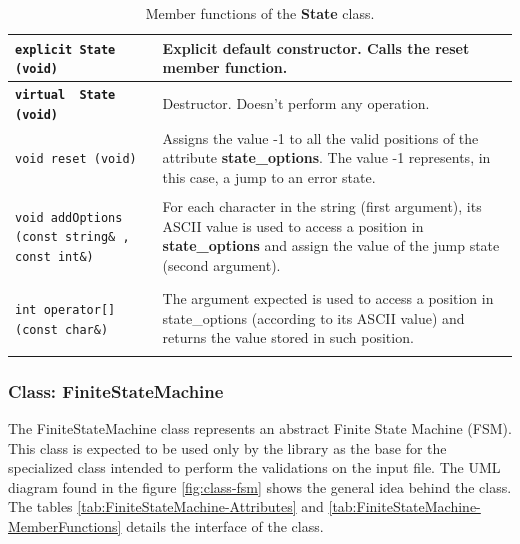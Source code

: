 \documentclass[11pt,twoside,openany,x11names,svgnames]{memoir}
\begin{document}
\begin{table}[h]\footnotesize
\centering
\begin{tabular}{| >{\bfseries}p{7.5cm} | p{8cm} |}
	\hline
	
	\texttt{explicit State (void)} & Explicit default constructor. Calls the \textbf{reset} member function. \\
	
	\hline
	
	\texttt{virtual ~State (void)} & Destructor. Doesn't perform any operation. \\
	
	\hline
	
	\texttt{void reset (void)} & Assigns the value -1 to all the valid positions of the attribute \textbf{state\_options}. The value -1 represents, in this case, a jump to an error state. \\
	
	\hline 
	
	\texttt{void addOptions (const string\& , const int\&)} & For each character in the string (first argument), its ASCII value is used to access a position in \textbf{state\_options} and assign the value of the jump state (second argument). \\
	
	\hline
	
	\texttt{int operator[] (const char\&)} & The argument expected is used to access a position in state\_options (according to its ASCII value) and returns the value stored in such position. \\ 
	
	\hline
\end{tabular}
\caption{Member functions of the \textbf{State} class.}
\label{tab:State-MemberFunctions}
\end{table}

\newpage 

\subsubsection{Class: FiniteStateMachine}\label{Class-FiniteStateMachine}

The FiniteStateMachine class represents an abstract Finite State Machine (FSM). This class is expected to be used only by the library as the base for the specialized class intended to perform the validations on the input file. The UML diagram found in the figure \ref{fig:class-fsm} shows the general idea behind the class. The tables \ref{tab:FiniteStateMachine-Attributes} and \ref{tab:FiniteStateMachine-MemberFunctions} details the interface of the class.
\end{document}
